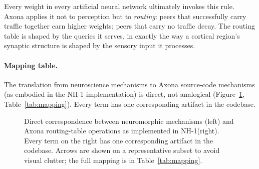 \documentclass[conference]{IEEEtran}
\newcommand{\axona}{Axona\xspace}
\newcommand{\nhone}{NH-1\xspace}
\begin{document}
\noindent
Every weight in every artificial neural network ultimately invokes
this rule. \axona applies it not to perception but to \emph{routing}:
peers that successfully carry traffic together earn higher weights;
peers that carry no traffic decay. The routing table is shaped by
the queries it serves, in exactly the way a cortical region's
synaptic structure is shaped by the sensory input it processes.

\paragraph{Mapping table.}
The translation from neuroscience mechanisms to \axona source-code
mechanisms (as embodied in the \nhone implementation) is direct, not
analogical (Figure~\ref{fig:mapping}, Table~\ref{tab:mapping}). Every
term has one corresponding artifact in the codebase.

\begin{figure}[t]
\centering
{}
\caption{Direct correspondence between neuromorphic mechanisms (left)
and \axona routing-table operations as implemented in \nhone (right).
Every term on the right has one corresponding artifact in the
codebase. Arrows are shown on a representative subset to avoid visual
clutter; the full mapping is in Table~\ref{tab:mapping}.}
\label{fig:mapping}
\end{figure}
\end{document}
